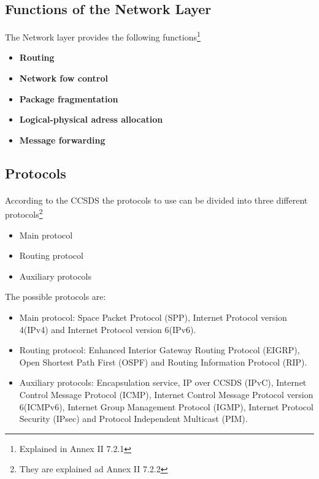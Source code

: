 %
%
%
%
%
%
%

\subsection{Functions of the Network Layer}
The Network layer provides the following functions\footnote{Explained in Annex II 7.2.1}
\begin{itemize}
\item \textbf{Routing}
\item \textbf{Network fow control}
\item \textbf{Package fragmentation}
\item \textbf{Logical-physical adress allocation}
\item \textbf{Message forwarding}
\end{itemize}

\subsection{Protocols}
\paragraph{}According to the CCSDS the protocols to use can be divided into three different protocols\footnote{They are explained ad Annex II 7.2.2} 
\begin{itemize}
\item Main protocol
\item Routing protocol
\item Auxiliary protocols
\end{itemize}
The possible protocols are:
\begin{itemize}
\item Main protocol: Space Packet Protocol (SPP), Internet Protocol version 4(IPv4) and Internet Protocol version 6(IPv6).
\item Routing protocol: Enhanced Interior Gateway Routing Protocol (EIGRP), Open Shortest Path First (OSPF) and Routing Information Protocol (RIP).
\item Auxiliary protocols: Encapsulation service, IP over CCSDS (IPvC), Internet Control Message Protocol (ICMP), Internet Control Message Protocol version 6(ICMPv6), Internet Group Management Protocol (IGMP), Internet Protocol Security (IPsec) and Protocol Independent Multicast (PIM).
\end{itemize}
